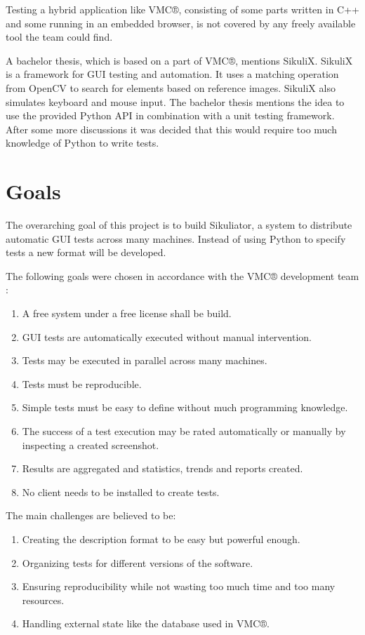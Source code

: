 \documentclass[a4paper,twocolumn]{article}
\newcommand{\VMC}[0]{VMC®}
\begin{document}
Testing a hybrid application like \VMC{}, consisting of some parts written in C++ and some running in an embedded browser, is not covered by any freely available tool the team could find.

A bachelor thesis\cite{BachelorMapViewer}, which is based on a part of \VMC{}, mentions SikuliX\cite{SikuliX}.
SikuliX is a framework for GUI testing and automation.
It uses a matching operation from OpenCV\cite{OpenCV} to search for elements based on reference images.
SikuliX also simulates keyboard and mouse input.
The bachelor thesis mentions the idea to use the provided Python API in combination with a unit testing framework.
After some more discussions it was decided that this would require too much knowledge of Python to write tests.

\section{Goals}
The overarching goal of this project is to build Sikuliator, a system to distribute automatic GUI tests across many machines.
Instead of using Python to specify tests a new format will be developed.


The following goals were chosen in accordance with the \VMC{} development team :
\begin{enumerate}
	\item A free system under a free license shall be build.
	\item GUI tests are automatically executed without manual intervention.
	\item Tests may be executed in parallel across many machines.
	\item Tests must be reproducible.
	\item Simple tests must be easy to define without much programming knowledge.
	\item The success of a test execution may be rated automatically or manually by inspecting a created screenshot.
	\item Results are aggregated and statistics, trends and reports created.
	\item No client needs to be installed to create tests.
\end{enumerate}



The main challenges are believed to be:
\begin{enumerate}
	\item Creating the description format to be easy but powerful enough.
	\item Organizing tests for different versions of the software.
	\item Ensuring reproducibility while not wasting too much time and too many resources.
	\item Handling external state like the database used in \VMC{}.
\end{enumerate}
\end{document}
